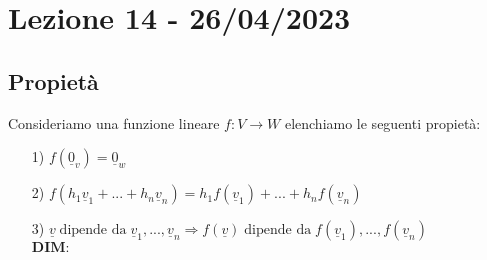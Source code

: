 \section{Lezione 14 - 26/04/2023}

\subsection{Propietà}
Consideriamo una funzione lineare $f: V \rightarrow W$ elenchiamo le seguenti propietà:
\begin{itemize}
\item[1)] $f(\underline{0}_v) = \underline{0}_w$
\item[2)] $f(h_1\underline{v}_1+...+h_n\underline{v}_n) = h_1f(\underline{v}_1)+...+h_nf(\underline{v}_n)$
\item[3)] $\underline{v} \; \text{dipende da} \; \underline{v}_1,...,\underline{v}_n \Rightarrow f(\underline{v}) \; \text{dipende da} \; f(\underline{v}_1),...,f(\underline{v}_n)$\\
$\textbf{DIM:}$
$$  $$
 
\end{itemize}


